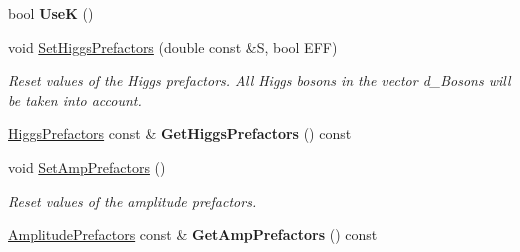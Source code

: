 \begin{DoxyCompactItemize}
\item 
\hypertarget{classHiggsModel_acd450a454977065794aa76695963c8eb}{}bool {\bfseries Use\+K} ()\label{classHiggsModel_acd450a454977065794aa76695963c8eb}

\item 
void \hyperlink{classHiggsModel_a43f6951291eef31cc18116f7d49f839f}{Set\+Higgs\+Prefactors} (double const \&S, bool E\+F\+F)
\begin{DoxyCompactList}\small\item\em Reset values of the Higgs prefactors. All Higgs bosons in the vector d\+\_\+\+Bosons will be taken into account. \end{DoxyCompactList}\item 
\hypertarget{classHiggsModel_a36b052bac528028a1757554d45901513}{}\hyperlink{structHiggsPrefactors}{Higgs\+Prefactors} const \& {\bfseries Get\+Higgs\+Prefactors} () const \label{classHiggsModel_a36b052bac528028a1757554d45901513}

\item 
\hypertarget{classHiggsModel_a514e3dd7854409c622b8e200fe2ee84c}{}void \hyperlink{classHiggsModel_a514e3dd7854409c622b8e200fe2ee84c}{Set\+Amp\+Prefactors} ()\label{classHiggsModel_a514e3dd7854409c622b8e200fe2ee84c}

\begin{DoxyCompactList}\small\item\em Reset values of the amplitude prefactors. \end{DoxyCompactList}\item 
\hypertarget{classHiggsModel_a77b35a425c80b8d9006354670f91acca}{}\hyperlink{structAmplitudePrefactors}{Amplitude\+Prefactors} const \& {\bfseries Get\+Amp\+Prefactors} () const \label{classHiggsModel_a77b35a425c80b8d9006354670f91acca}


\end{DoxyCompactItemize}
